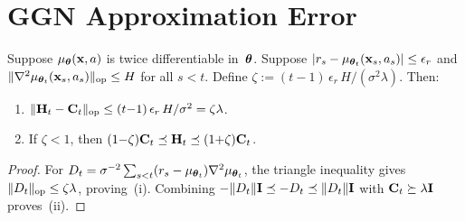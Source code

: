 \section{GGN Approximation Error}\label{app:ggn-approx}

\begin{lemma}\label{lem:ggn-approx}
Suppose $\mu_{\boldsymbol{\theta}}(\mathbf{x},a)$ is twice differentiable in~$\boldsymbol{\theta}$.
Suppose $|r_s - \mu_{\boldsymbol{\theta}_t}(\mathbf{x}_s,a_s)| \le \epsilon_r$ and
$\|\nabla^2 \mu_{\boldsymbol{\theta}_t}(\mathbf{x}_s,a_s)\|_{\mathrm{op}} \le H$
for all $s < t$.
Define $\zeta := (t{-}1)\,\epsilon_r\, H / (\sigma^2 \lambda)$.
Then:
\begin{enumerate}[nosep,label=(\roman*)]
\item $\|\mathbf{H}_t - \mathbf{C}_t\|_{\mathrm{op}}
\le (t{-}1)\,\epsilon_r\, H / \sigma^2 = \zeta\lambda$.
\item If $\zeta < 1$, then
$(1{-}\zeta)\mathbf{C}_t \preceq \mathbf{H}_t \preceq (1{+}\zeta)\mathbf{C}_t$.
\end{enumerate}
\end{lemma}
\begin{proof}
For $D_t=\sigma^{-2}\sum_{s<t}(r_s-\mu_{\boldsymbol{\theta}_t})
\nabla^2\mu_{\boldsymbol{\theta}_t}$, the triangle inequality gives
$\|D_t\|_{\rm op}\le\zeta\lambda$, proving~(i).  Combining
$-\|D_t\|\mathbf{I}\preceq-D_t\preceq\|D_t\|\mathbf{I}$ with
$\mathbf{C}_t\succeq\lambda\mathbf{I}$ proves~(ii).
\end{proof}

